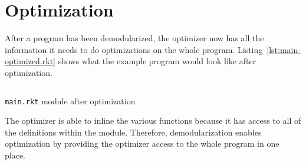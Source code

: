 \section{Optimization}

After a program has been demodularized, the optimizer now has all the information it needs to do optimizations on the whole program.
Listing~\ref{lst:main-optimized.rkt} shows what the example program would look like after optimization.

\begin{listing}
  \inputminted{racket}{listings/main-optimized.rkt}
  \caption{\texttt{main.rkt} module after optimization}
  \label{lst:main-optimized.rkt}
\end{listing}

The optimizer is able to inline the various functions because it has access to all of the definitions within the module.
Therefore, demodularization enables optimization by providing the optimizer access to the whole program in one place.
